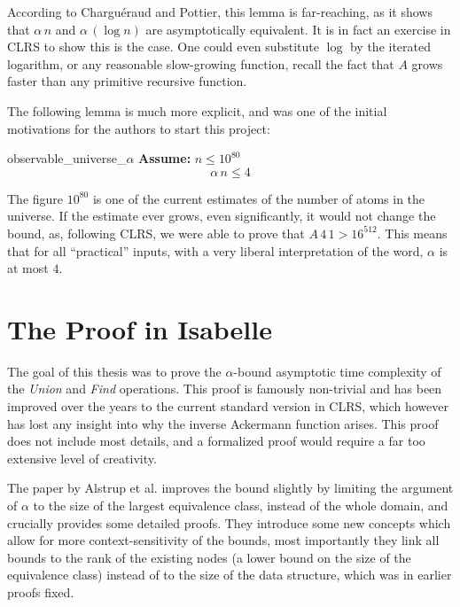 \documentclass[headsepline,footsepline,footinclude=false,oneside,fontsize=11pt,paper=a4,listof=totoc,bibliography=totoc]{scrbook} %
\begin{document}
According to Charguéraud and Pottier, this lemma is far-reaching, as it shows that $\alpha \, n$ and $\alpha \, (\log{n})$ are asymptotically equivalent. It is in fact an exercise in CLRS to show this is the case. One could even substitute $\log$ by the iterated logarithm, or any reasonable slow-growing function, recall the fact that $A$ grows faster than any primitive recursive function.

The following lemma is much more explicit, and was one of the initial motivations for the authors to start this project:

\begin{lemma}{observable\_universe\_$\alpha$}
		\newline
	\textbf{Assume:} $n \leq 10^{80} $
	\begin{equation}
	\alpha \, n \leq 4 \label{universealpha}
	\end{equation}
\end{lemma}

The figure $10^{80}$ is one of the current estimates of the number of atoms in the universe. If the estimate ever grows, even significantly, it would not change the bound, as, following CLRS, we were able to prove that $A\, 4\, 1 > 16^{512}$. This means that for all ``practical'' inputs, with a very liberal interpretation of the word, $\alpha$ is at most $4$.






\chapter{The Proof in Isabelle}

The goal of this thesis was to prove the $\alpha$-bound asymptotic time complexity of the \textit{Union} and \textit{Find} operations. This proof is famously non-trivial and has been improved over the years to the current standard version in CLRS, which however has lost any insight into why the inverse Ackermann function arises. This proof does not include most details, and a formalized proof would require a far too extensive level of creativity.

The paper by Alstrup et al. improves the bound slightly by limiting the argument of $\alpha$ to the size of the largest equivalence class, instead of the whole domain, and crucially provides some detailed proofs. They introduce some new concepts which allow for more context-sensitivity of the bounds, most importantly they link all bounds to the rank of the existing nodes (a lower bound on the size of the equivalence class) instead of to the size of the data structure, which was in earlier proofs fixed. 
\end{document}
